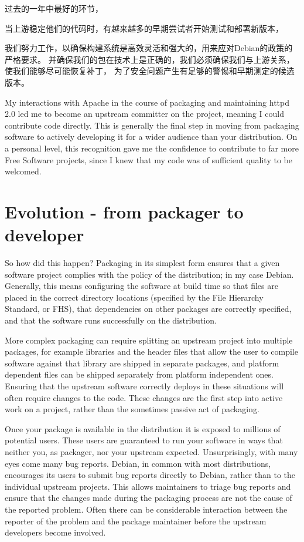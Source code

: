 过去的一年中最好的环节，{当上游稳定他们的代码时，有越来越多的早期尝试者开始测试和部署新版本，
{我们努力工作，以确保构建系统是高效灵活和强大的，用来应对Debian的政策的严格要求。
并确保我们的包在技术上是正确的，我们必须确保我们与上游关系，使我们能够尽可能恢复补丁，
为了安全问题产生有足够的警惕和早期测定的候选版本。

My interactions with Apache in the course of packaging and maintaining httpd 2.0
led me to become an upstream committer on the project, meaning I could
contribute code directly. This is generally the final step in moving from
packaging software to actively developing it for a wider audience than your
distribution. On a personal level, this recognition gave me the confidence to
contribute to far more Free Software projects, since I knew that my code was of
sufficient quality to be welcomed. 

\section*{Evolution - from packager to developer}
So how did this happen? Packaging in its simplest form ensures that a given
software project complies with the policy of the distribution; in my case
Debian. Generally, this means configuring the software at build time so that
files are placed in the correct directory locations (specified by the File
Hierarchy Standard, or FHS), that dependencies on other packages are correctly
specified, and that the software runs successfully on the distribution. 

More complex packaging can require splitting an upstream project into multiple
packages, for example libraries and the header files that allow the user to
compile software against that library are shipped in separate packages, and
platform dependent files can be shipped separately from platform independent
ones. Ensuring that the upstream software correctly deploys in these situations will often require changes to the code. These changes are the first step into active work on a project, rather than the sometimes passive act of packaging. 

Once your package is available in the distribution it is exposed to millions of
potential users. These users are guaranteed to run your software in ways that
neither you, as packager, nor your upstream expected. Unsurprisingly, with many
eyes come many bug reports. Debian, in common with most distributions,
encourages its users to submit bug reports directly to Debian, rather than to
the individual upstream projects. This allows maintainers to triage bug reports
and ensure that the changes made during the packaging process are not the cause
of the reported problem. Often there can be considerable interaction between the
reporter of the problem and the package maintainer before the upstream
developers become involved.

}}
